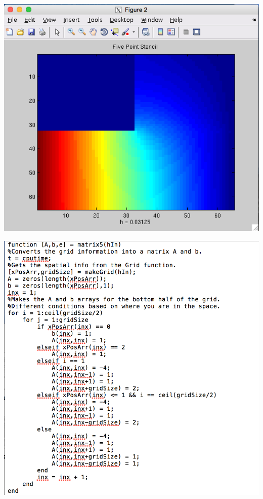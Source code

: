 \documentclass[11pt, oneside]{article}   	%
\begin{document}
\centerline{\includegraphics[scale = 0.55]{FivePoint_h5.png}}

\centerline{\includegraphics[scale = 0.7]{matrix5Code_1.png}} 
\end{document}
